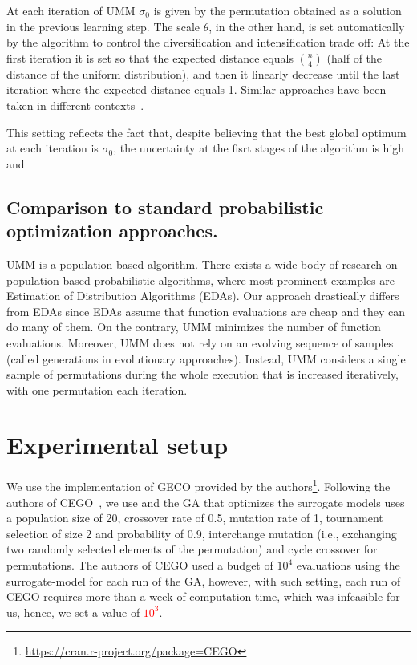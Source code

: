 \documentclass[runningheads]{llncs}
\begin{document}
At each iteration of UMM $\sigma_0$ is given by the permutation obtained as a solution in the previous learning step. The scale $\theta$, in the other hand, is set automatically by the algorithm to control the diversification and intensification trade off: At the first iteration it is set so that the expected distance equals  ${n\choose 4}$ (half of the distance of the uniform distribution), and then it linearly decrease until the last iteration where the expected distance equals 1. Similar approaches have been taken in different contexts~\cite{arza2019approaching}.

This setting reflects the fact that, despite believing that the best global optimum at each iteration is $\sigma_0$, the uncertainty at the fisrt stages of the algorithm is high and



\subsection{Comparison to standard probabilistic optimization approaches.}
UMM is a population based algorithm. There exists a wide body of research on population based probabilistic algorithms, where most prominent examples are Estimation of Distribution Algorithms (EDAs). Our approach drastically differs from EDAs since EDAs assume that function evaluations are cheap and they can do many of them. On the contrary, UMM minimizes the number of function evaluations. Moreover, UMM does not rely on an evolving sequence of samples (called generations in evolutionary approaches). Instead, UMM considers a single sample of permutations during the whole execution that is increased iteratively, with one permutation each iteration. 









\section{Experimental setup}

We use the implementation of GECO provided by the
authors\footnote{\url{https://cran.r-project.org/package=CEGO}}. Following the
authors of CEGO~\citep{ZaeStoFriFisNauBar2014,ZaeStoBar2014:ppsn}, we use and
the GA that optimizes the surrogate models uses a population size of 20,
crossover rate of 0.5, mutation rate of 1, tournament selection of size 2 and
probability of 0.9, interchange mutation (i.e., exchanging two randomly
selected elements of the permutation) and cycle crossover for permutations. The
authors of CEGO used a budget of $10^4$ evaluations using the surrogate-model
for each run of the GA, however, with such setting, each run of CEGO requires
more than a week of computation time, which was infeasible for us, hence, we
set a value of \textcolor{red}{$10^3$}.
\end{document}
